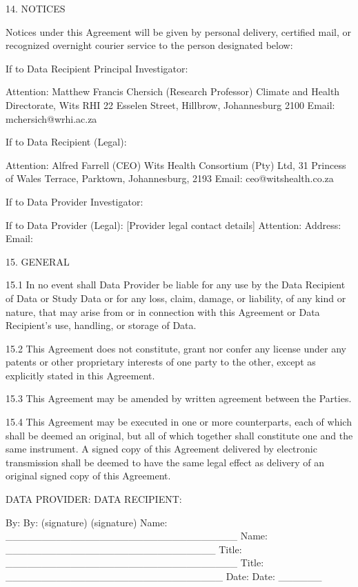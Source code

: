 \documentclass[12pt,letterpaper]{article}
\begin{document}
14.	NOTICES

Notices under this Agreement will be given by personal delivery, certified mail, or recognized overnight courier service to the person designated below:

If to Data Recipient Principal Investigator:

Attention: Matthew Francis Chersich (Research Professor)  Climate and Health Directorate, Wits RHI 22 Esselen Street, Hillbrow, Johannesburg 2100  Email: mchersich@wrhi.ac.za 

If to Data Recipient (Legal):

Attention: Alfred Farrell (CEO) Wits Health Consortium (Pty) Ltd, 31 Princess of Wales Terrace, Parktown, Johannesburg, 2193 Email: ceo@witshealth.co.za  

If to Data Provider Investigator:

If to Data Provider (Legal): [Provider legal contact details] Attention: Address: Email:

15.	GENERAL

15.1	In no event shall Data Provider be liable for any use by the Data Recipient of Data or Study Data or for any loss, claim, damage, or liability, of any kind or nature, that may arise from or in connection with this Agreement or Data Recipient’s use, handling, or storage of Data.  

15.2	This Agreement does not constitute, grant nor confer any license under any patents or other proprietary interests of one party to the other, except as explicitly stated in this Agreement.

15.3	This Agreement may be amended by written agreement between the Parties.

15.4	This Agreement may be executed in one or more counterparts, each of which shall be deemed an original, but all of which together shall constitute one and the same instrument. A signed copy of this Agreement delivered by electronic transmission shall be deemed to have the same legal effect as delivery of an original signed copy of this Agreement.

DATA PROVIDER: 		DATA RECIPIENT:

By: 		By: 					     (signature)			(signature) Name: \_\_\_\_\_\_\_\_\_\_\_\_\_\_\_\_\_\_\_\_\_\_\_\_\_\_\_\_\_\_\_\_		Name: \_\_\_\_\_\_\_\_\_\_\_\_\_\_\_\_\_\_\_\_\_\_\_\_\_\_\_\_\_ Title: \_\_\_\_\_\_\_\_\_\_\_\_\_\_\_\_\_\_\_\_\_\_\_\_\_\_\_\_\_\_\_\_			Title: \_\_\_\_\_\_\_\_\_\_\_\_\_\_\_\_\_\_\_\_\_\_\_\_\_\_\_\_\_\_                 Date: 		Date: 				\_\_\_\_\_\_	
\end{document}
